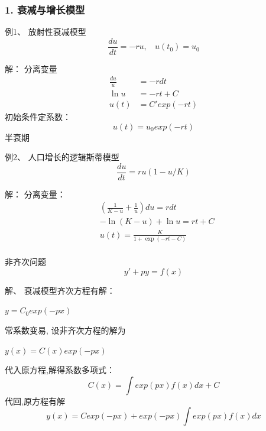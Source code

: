 \begin{frame}
\frametitle{1. 衰减与增长模型}
\begin{exampleblock} {例1、	放射性衰减模型}
	\begin{equation*}
	\frac{du}{dt}	= - ru, ~~~~ u(t_0) = u_0
	\end{equation*}
	\end{exampleblock} 	
	\alert{解：} 分离变量
	\begin{align*}
		\frac{du}{u} &= - rdt\\
		\ln u &=-rt+C\\
		u(t)&=C'exp(-rt)	
	\end{align*}
	初始条件定系数：
	\begin{equation*}
		u(t)=u_0 exp(-rt)
	\end{equation*}
    {\color{red}{[X]}} 半衰期 
\end{frame}

\begin{frame}
	\begin{exampleblock} {例2、	人口增长的逻辑斯蒂模型}
	\begin{equation*}
		\frac{d u}{d t}=r u (1-u/K)
	\end{equation*}
	\end{exampleblock} 	
	\alert{解：} 分离变量：
	\begin{align*}
		&(\frac{1}{K-u}+\frac{1}{u} ) d u =r d t \\
		&-\ln (K-u)+\ln u =r t+C \\
		&u(t) = \frac{K}{1+ \exp (-r t-C)}	\\
	\end{align*}	
\end{frame}

\begin{frame}
        \begin{exampleblock} {非齐次问题}
        \begin{equation*}
            y'+py=f(x)
        \end{equation*}
        \end{exampleblock}
        \alert{解、} 衰减模型齐次方程有解：\\
        \begin{center}
            $y=C_0 exp(-px)$
        \end{center} 
        {\color{red}{[X]}} 常系数变易, 设非齐次方程的解为\\ 
        \begin{center}
            $y(x) =C(x) exp(-px)$
        \end{center} 
        代入原方程,解得系数多项式：
            \[C(x) = \int exp(px) f (x)dx + C\]
        代回,原方程有解 \[  y(x)=C exp(-px)+exp(-px) \int exp(px)f(x)dx \]
    \end{frame}

